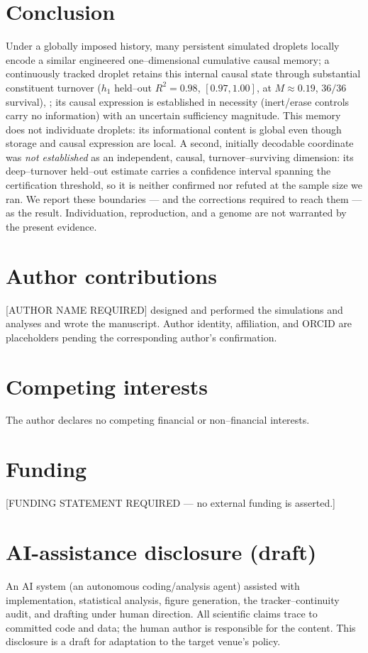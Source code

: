 \documentclass[11pt]{article}
\begin{document}
\section{Conclusion}
Under a globally imposed history, many persistent simulated droplets locally encode a similar engineered
one--dimensional cumulative causal memory; a continuously tracked droplet retains this internal causal state through
substantial constituent turnover ($h_1$ held--out $R^2=0.98$, $[0.97,1.00]$, at $M\approx0.19$, $36/36$ survival),
; its causal expression is established in necessity (inert/erase controls carry no information) with an uncertain sufficiency magnitude. This memory does not individuate droplets: its informational content
is global even though storage and causal expression are local. A second, initially decodable coordinate was \emph{not established} as an independent, causal, turnover--surviving dimension: its deep--turnover held--out estimate carries a confidence interval spanning the certification threshold, so it is neither confirmed nor refuted at the sample size we ran.
We report these boundaries --- and the corrections required to reach them --- as the result. Individuation,
reproduction, and a genome are not warranted by the present evidence.

\section*{Author contributions}
[AUTHOR NAME REQUIRED] designed and performed the simulations and analyses and wrote the manuscript. Author
identity, affiliation, and ORCID are placeholders pending the corresponding author's confirmation.

\section*{Competing interests}
The author declares no competing financial or non--financial interests.

\section*{Funding}
[FUNDING STATEMENT REQUIRED --- no external funding is asserted.]

\section*{AI-assistance disclosure (draft)}
An AI system (an autonomous coding/analysis agent) assisted with implementation, statistical analysis, figure
generation, the tracker--continuity audit, and drafting under human direction. All scientific claims trace to
committed code and data; the human author is responsible for the content. This disclosure is a draft for adaptation
to the target venue's policy.
\end{document}
